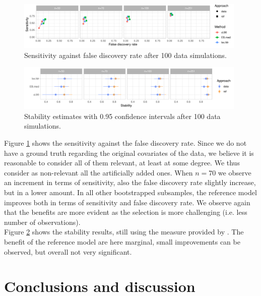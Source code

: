 \documentclass[american,]{article}
\theoremstyle{definition}
\begin{document}
\begin{figure}[tp]
  \centering
  \includegraphics[width=0.98\textwidth]{graphics/bodyfat_sensitivity_vs_fdr.pdf}
  \caption{Sensitivity against false discovery rate after 100 data simulations.\\}
  \label{fig:bodyfat_sensitivity_vs_fdr}
\end{figure}

\begin{figure}[tp]
  \centering
  \includegraphics[width=0.98\textwidth]{graphics/bodyfat_stability.pdf}
  \caption{Stability estimates with 0.95 confidence intervals after 100 data simulations.\\}
  \label{fig:bodyfat_stability}
\end{figure}

Figure \ref{fig:bodyfat_sensitivity_vs_fdr} shows the sensitivity against the false discovery rate. Since we do not have a ground truth regarding the original covariates of the data, we believe it is reasonable to consider all of them relevant, at least at some degree. We thus consider as non-relevant all the artificially added ones. When $n=70$ we observe an increment in terms of sensitivity, also the false discovery rate slightly increase, but in a lower amount. In all other bootstrapped subsamples, the reference model improves both in terms of sensitivity and false discovery rate. We observe again that the benefits are more evident as the selection is more challenging (i.e. less number of observations).
\\
Figure \ref{fig:bodyfat_stability} shows the stability results, still using the measure provided by \cite{paper:stability}. The benefit of the reference model are here marginal, small improvements can be observed, but overall not very significant.


\hypertarget{conclusions}{%
\section{Conclusions and discussion}\label{conclusions}}



\end{document}
